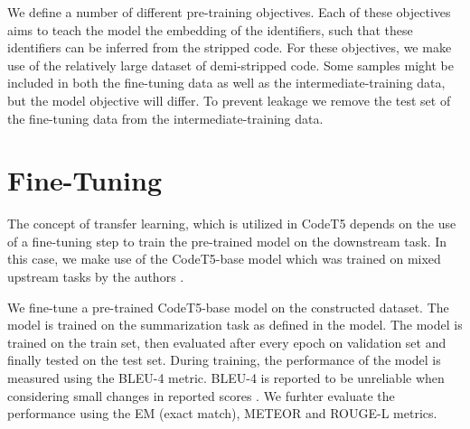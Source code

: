 We define a number of different pre-training objectives. Each of these objectives aims to teach the model the embedding of the identifiers, such that these identifiers can be inferred from the stripped code. For these objectives, we make use of the relatively large dataset of demi-stripped code. Some samples might be included in both the fine-tuning data as well as the intermediate-training data, but the model objective will differ. To prevent leakage we remove the test set of the fine-tuning data from the intermediate-training data. 

\section{Fine-Tuning}
The concept of transfer learning, which is utilized in CodeT5 depends on the use of a fine-tuning step to train the pre-trained model on the downstream task. In this case, we make use of the CodeT5-base model which was trained on mixed upstream tasks by the authors \cite{CodeT5}.

We fine-tune a pre-trained CodeT5-base model on the constructed dataset. The model is trained on the summarization task as defined in the model. The model is trained on the train set, then evaluated after every epoch on validation set and finally tested on the test set. During training, the performance of the model is measured using the BLEU-4 metric. BLEU-4 is reported to be unreliable when considering small changes in reported scores \cite{CodeSumMetrics}. We furhter evaluate the performance using the EM (exact match), METEOR and ROUGE-L metrics.

